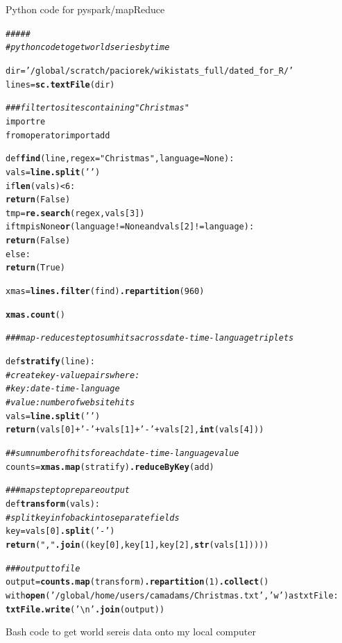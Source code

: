 \documentclass{article}\usepackage[]{graphicx}\usepackage[]{color}
\makeatletter
\newcommand{\hlstr}[1]{\textcolor[rgb]{0.192,0.494,0.8}{#1}}%
\newcommand{\hlcom}[1]{\textcolor[rgb]{0.678,0.584,0.686}{\textit{#1}}}%
\newcommand{\hlkwd}[1]{\textcolor[rgb]{0.737,0.353,0.396}{\textbf{#1}}}%
\newenvironment{kframe}{%
 \def\at@end@of@kframe{}%
 \ifinner\ifhmode%
  \def\at@end@of@kframe{\end{minipage}}%
  \begin{minipage}{\columnwidth}%
 \fi\fi%
 \def\FrameCommand##1{\hskip\@totalleftmargin \hskip-\fboxsep
 \colorbox{shadecolor}{##1}\hskip-\fboxsep
     \hskip-\linewidth \hskip-\@totalleftmargin \hskip\columnwidth}%
 \MakeFramed {\advance\hsize-\width
   \@totalleftmargin\z@ \linewidth\hsize
   \@setminipage}}%
 {\par\unskip\endMakeFramed%
 \at@end@of@kframe}
\newenvironment{knitrout}{}{} %
\makeatother
\begin{document}
Python code for pyspark/mapReduce
\begin{knitrout}
\color{fgcolor}\begin{kframe}
\begin{alltt}
\hlcom{#####}
\hlcom{# python code to get world series by time}

dir=\hlstr{'/global/scratch/paciorek/wikistats_full/dated_for_R/'}
lines=\hlkwd{sc.textFile}(dir)

\hlcom{### filter to sites containing "Christmas"}
import re
from operator import add

def \hlkwd{find}(line, regex = \hlstr{"Christmas"}, language = None): 
    vals = \hlkwd{line.split}(\hlstr{' '})
    if \hlkwd{len}(vals) < 6:
        \hlkwd{return}(False)
    tmp = \hlkwd{re.search}(regex, vals[3])
    if tmp is None \hlkwd{or} (language != None and vals[2] != language):
        \hlkwd{return}(False)
    else:
        \hlkwd{return}(True)
  
xmas=\hlkwd{lines.filter}(find)\hlkwd{.repartition}(960)

\hlkwd{xmas.count}()

\hlcom{### map-reduce step to sum hits across date-time-language triplets}

def \hlkwd{stratify}(line):
\hlcom{    # create key-value pairs where:}
\hlcom{    #   key: date-time-language}
\hlcom{    #   value: number of website hits}
    vals=\hlkwd{line.split}(\hlstr{' '})
    \hlkwd{return}(vals[0]+\hlstr{'-'}+vals[1]+\hlstr{'-'}+vals[2],\hlkwd{int}(vals[4]))

\hlcom{## sum number of hits for each date-time-language value}
counts=\hlkwd{xmas.map}(stratify)\hlkwd{.reduceByKey}(add)

\hlcom{### map step to prepare output}
def \hlkwd{transform}(vals):
\hlcom{    # split key info back into separate fields}
    key=vals[0]\hlkwd{.split}(\hlstr{'-'})
    \hlkwd{return}(\hlstr{","}\hlkwd{.join}((key[0],key[1],key[2],\hlkwd{str}(vals[1]))))

\hlcom{### output to file}
output=\hlkwd{counts.map}(transform)\hlkwd{.repartition}(1)\hlkwd{.collect}()
with \hlkwd{open}(\hlstr{'/global/home/users/camadams/Christmas.txt'}, \hlstr{'w'}) as txtFile:
  \hlkwd{txtFile.write}(\hlstr{'\textbackslash{}n'}\hlkwd{.join}(output))
\end{alltt}
\end{kframe}
\end{knitrout}

Bash code to get world sereis data onto my local computer
\end{document}
